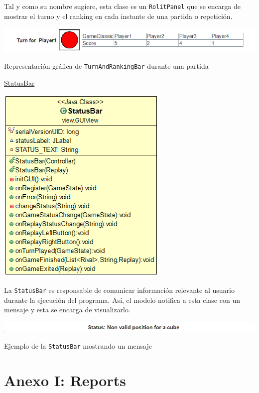 \documentclass[12pt,a4paper,openright]{book}
\theoremstyle{break}
\begin{document}
Tal y como su nombre sugiere, esta clase es un \texttt{RolitPanel} que se encarga de mostrar el turno y el ranking en cada instante de una partida o repetición.


\begin{center}
\includegraphics[scale=0.8]{turnranking-pic.png}

Representación gráfica de \texttt{TurnAndRankingBar} durante una partida
\end{center}

\newpage
\underline{StatusBar}
\begin{center}
\includegraphics[scale=0.60]{statusbar-uml.png}
\end{center}

La \texttt{StatusBar} es responsable de comunicar información relevante al usuario durante la ejecución del programa. Así, el modelo notifica a esta clase con un mensaje y esta se encarga de visualizarlo.

\begin{center}
\includegraphics[scale=0.80]{statusbar-pic.png}

Ejemplo de la \texttt{StatusBar} mostrando un mensaje
\end{center}


\newpage
\chapter{Anexo I: Reports}
\end{document}
